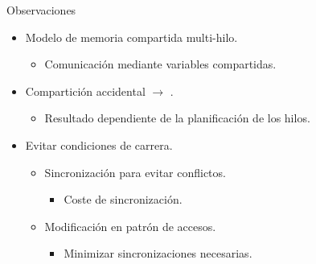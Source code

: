 \begin{frame}[t]{Observaciones}
\begin{itemize}
  \item Modelo de memoria compartida multi-hilo.
    \begin{itemize}
      \item Comunicación mediante variables compartidas.
    \end{itemize}

  \item Compartición accidental $\rightarrow$ .
    \begin{itemize}
      \item Resultado dependiente de la planificación de los hilos.
    \end{itemize}

  \item Evitar condiciones de carrera.
    \begin{itemize}
      \item Sincronización para evitar conflictos.
        \begin{itemize}
          \item Coste de sincronización.
        \end{itemize}
      \item Modificación en patrón de accesos.
        \begin{itemize}
          \item Minimizar sincronizaciones necesarias.
        \end{itemize}
    \end{itemize}

\end{itemize}
\end{frame}
